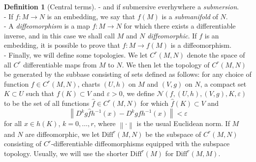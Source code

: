 \documentclass[11pt, a4paper]{memoir}
\theoremstyle{plain}
\theoremstyle{definition}
\newtheorem{defn}{Definition}
\newcommand{\norm}[1]{\left\lVert#1\right\rVert}
\begin{document}
\begin{defn}[Central terms]
- and if submersive everhywhere a \emph{submersion}.\\
- If $f: M\to N$ is an embedding, we say that $f(M)$ is a \emph{submanifold} of $N$.\\
- A \emph{diffeomorphism} is a map $f:M\to N$ for which there exists a differentiable inverse, and in this case we shall call $M$ and $N$ \emph{diffeomorphic}. If $f$ is an embedding, it is possible to prove that $f:M\to f(M)$ is a diffeomorphism.\\
- Finally, we will define some topologies. We let $C^r(M,N)$ denote the space of all $C^r$ differentiable maps from $M$ to $N$. We then let the topology of $C^r(M,N)$ be generated by the subbase consisting of sets defined as follows: for any choice of function $f\in C^r(M,N)$, charts $(U,h)$ on $M$ and $(V,g)$ on $N$, a compact set $K\subset U$ such that $f(K)\subset V$ and $\varepsilon>0$, we define $\mathcal{N}(f,(U,h),(V,g),K,\varepsilon)$ to be the set of all functions $\hat{f}\in C^r(M,N)$ for which $\hat{f}(K)\subset V$ and
$$\norm{D^kg\hat{f}h^{-1}(x)-D^kgfh^{-1}(x)}<\varepsilon$$
for all $x\in h(K)$, $k=0,\ldots,r$, where $\norm{\cdot}$ is the usual Euclidean norm. If $M$ and $N$ are diffeomorphic, we let $\text{Diff}^r(M,N)$ be the subspace of $C^r(M,N)$ consisting of $C^r$-differentiable diffeomorphisms equipped with the subspace topology. Usually, we will use the shorter $\text{Diff}^r(M)$ for $\text{Diff}^r(M,M)$.
\end{defn}
\end{document}
